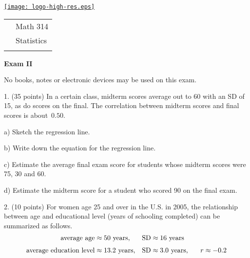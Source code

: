 \documentclass[10pt]{article}
\begin{document}
\pagestyle{empty}
\lstset{language=R, showspaces=false, showstringspaces=false}

\href{http://www.shepherd.edu}{\texttt{[image: logo-high-res.eps]}}
\vspace{-1.69cm}

{\small
\begin{tabular}{cl}
& Math 314\\
& Statistics\\
\hspace{5.28in} & %
\end{tabular}
}
\setlength{\baselineskip}{1.05\baselineskip}

\begin{center}
\textbf{\large  Exam II}
\end{center}
No books, notes or electronic devices may be used on this exam.
\medskip

1. (35 points) In a certain class, midterm scores average out to 60 with an SD of 15, as do 
scores on the final.  The correlation between midterm scores and final scores is 
about~$0.50$.   

\hspace{20pt} a) Sketch the regression line. %
\vspace{1.25in}

\hspace{20pt} b) Write down the equation for the regression line. %
\vspace{1in}

\hspace{20pt} c) 
Estimate the average final exam score for students whose midterm scores were
75, 30 and 60. %
\vspace{2.75in}

\hspace{20pt} d) Estimate the midterm score for a student who scored 90 on the final exam.
\vfill
\eject
{\ }


2. (10 points) For women age 25 and over in the U.S. in 2005, the relationship between
age and educational level (years of schooling completed) can be summarized as
follows. 
\begin{align*}
\mbox{average age}         & \approx \mbox{50 years,}    & \mbox{SD} & \approx \mbox{16 years}\\[3pt]
\mbox{average education level}  & \approx \mbox{13.2 years,}  & \mbox{SD} & \approx \mbox{3.0 years,
   \hspace{15pt}} r\approx -0.2
\end{align*}
\end{document}
